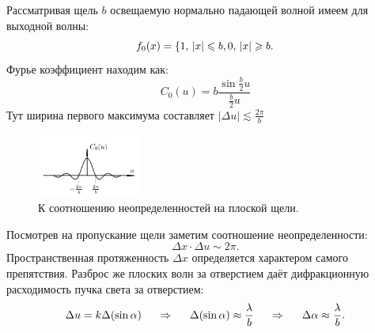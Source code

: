 Рассматривая щель $b$ освещаемую нормально падающей волной имеем для выходной волны:
\begin{equation*}
	f_0(x) = \left\{
	1, \, |x| \leq b,\\
	0, \, |x| \geq b.
	\right.
\end{equation*}
Фурье коэффициент находим как:
\begin{equation*}
	C_0(u) = b \frac{\sin \frac{b}{2}u}{\frac{b}{2}u}
\end{equation*}
Тут ширина первого максимума составляет $|\Delta u|\lesssim \frac{2 \pi}{b}$
\begin{figure}[h]
    \centering
    \includegraphics[width=0.3\textwidth]{figures/328.png}
    \caption{К соотношению неопределенностей на плоской щели.}
\end{figure}
Посмотрев на пропускание щели заметим соотношение неопределенности:
\begin{equation*}
	\Delta x \cdot \Delta u \sim 2 \pi.
\end{equation*}
Пространственная протяженность $\Delta x$ определяется характером самого препятствия. Разброс же плоских волн за отверстием даёт дифракционную расходимость пучка света за отверстием:
\begin{equation*}
	\Delta u = k \Delta(\sin \alpha)
	\hspace{0.5 cm}
	\Rightarrow
	\hspace{0.5 cm}
	\Delta(\sin \alpha) \approx \frac{\lambda}{b}
	\hspace{0.5 cm}
	\Rightarrow
	\hspace{0.5 cm}
	\Delta \alpha \approx \frac{\lambda}{b}.
\end{equation*}
